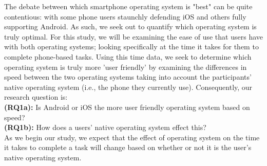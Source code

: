 \documentclass[conference]{IEEEtran}
\begin{document}
The debate between which smartphone operating system is "best" can be quite contentious: with some phone users staunchly defending iOS and others fully supporting Android. As such, we seek out to quantify which operating system is truly optimal. For this study, we will be examining the ease of use that users have with both operating systems; looking specifically at the time it takes for them to complete phone-based tasks. Using this time data, we seek to determine which operating system is truly more 'user friendly' by examining the differences in speed between the two operating systems taking into account the participants' native operating system (i.e., the phone they currently use). Consequently, our research question is: \\
\textbf{(RQ1a):} Is Android or iOS the more user friendly operating system based on speed? \\
\textbf{(RQ1b):} How does a users' native operating system effect this? \\
As we begin our study, we expect that the effect of operating system on the time it takes to complete a task will change based on whether or not it is the user's native operating system. 
\end{document}
